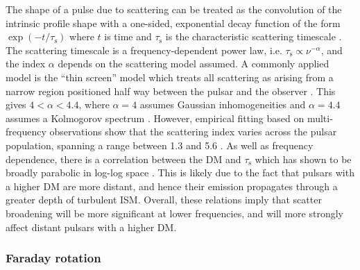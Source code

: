The shape of a pulse due to scattering can be treated as the convolution of the intrinsic profile shape with a one-sided, exponential decay function of the form $\exp{(-t/\tau_\mathrm{s})}$ where $t$ is time and $\tau_\mathrm{s}$ is the characteristic scattering timescale \citep{Sxxx1968}. The scattering timescale is a frequency-dependent power law, i.e. $\tau_\mathrm{s} \propto \nu^{-\alpha}$, and the index $\alpha$ depends on the scattering model assumed. A commonly applied model is the ``thin screen'' model which treats all scattering as arising from a narrow region positioned half way between the pulsar and the observer \citep[e.g.][]{Sxxx1968, Wxxx1972}. This gives $4 < \alpha < 4.4$, where $\alpha = 4$ assumes Gaussian inhomogeneities \citep{Lxxx1971,LLxx1976} and $\alpha = 4.4$ assumes a Kolmogorov spectrum \citep{Rxxx1977,LRK+2015}. However, empirical fitting based on multi-frequency observations show that the scattering index varies across the pulsar population, spanning a range between 1.3 and 5.6 \citep{SDOx1980,LMG+2004, LDKK2013, LKKx2015, GKK+2017}. As well as frequency dependence, there is a correlation between the DM and $\tau_\mathrm{s}$ which has shown to be broadly parabolic in log-log space \citep[e.g.][]{BCC+2004,GKK+2017,IJWx2019}. This is likely due to the fact that pulsars with a higher DM are more distant, and hence their emission propagates through a greater depth of turbulent ISM. Overall, these relations imply that scatter broadening will be more significant at lower frequencies, and will more strongly affect distant pulsars with a higher DM.


\subsubsection{Faraday rotation}
\label{sec: intro - observation processing - ISM effects - faraday rotation}

